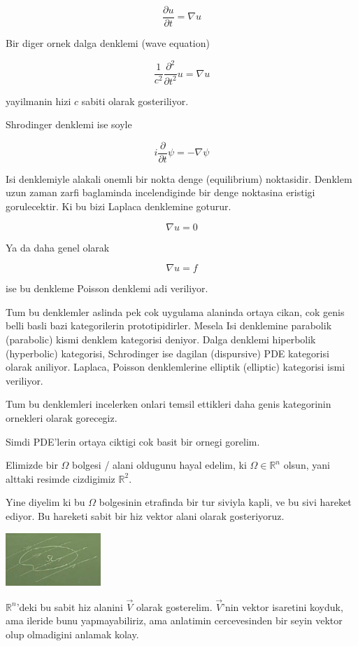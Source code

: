 \documentclass[12pt,fleqn]{article}
\begin{document}
\[ \frac{\partial u}{\partial t} = 
\nabla  u
\]

Bir diger ornek dalga denklemi (wave equation)

\[ \frac{1}{c^2} \frac{\partial ^2}{\partial t^2}u = \nabla u\]

yayilmanin hizi $c$ sabiti olarak gosteriliyor. 

Shrodinger denklemi ise soyle

\[ i \frac{\partial }{\partial t}\psi  = -\nabla \psi \]

Isi denklemiyle alakali onemli bir nokta denge (equilibrium)
noktasidir. Denklem uzun zaman zarfi baglaminda incelendiginde bir denge
noktasina eristigi gorulecektir. Ki bu bizi Laplaca denklemine goturur. 

\[ \nabla u = 0 \]

Ya da daha genel olarak 

\[ \nabla u = f \]

ise bu denkleme Poisson denklemi adi veriliyor. 

Tum bu denklemler aslinda pek cok uygulama alaninda ortaya cikan, cok genis
belli basli bazi kategorilerin prototipidirler. Mesela Isi denklemine
parabolik (parabolic) kismi denklem kategorisi deniyor. Dalga denklemi
hiperbolik (hyperbolic) kategorisi, Schrodinger ise dagilan (dispursive)
PDE kategorisi olarak aniliyor. Laplaca, Poisson denklemlerine elliptik
(elliptic) kategorisi ismi veriliyor. 

Tum bu denklemleri incelerken onlari temsil ettikleri daha genis
kategorinin ornekleri olarak gorecegiz. 

Simdi PDE'lerin ortaya ciktigi cok basit bir ornegi gorelim. 

Elimizde bir $\Omega$ bolgesi / alani oldugunu hayal edelim, ki $\Omega \in
\mathbb{R}^n$ olsun, 
yani alttaki resimde cizdigimiz $\mathbb{R}^2$.

Yine diyelim ki bu $\Omega$ bolgesinin etrafinda bir tur siviyla kapli, ve
bu sivi hareket ediyor. Bu hareketi sabit bir hiz vektor alani olarak
gosteriyoruz. 

\includegraphics[height=2cm]{1_1.png}

$\mathbb{R}^n$'deki bu sabit hiz alanini $\vec{V}$ olarak gosterelim. $\vec{V}$'nin vektor isaretini 
koyduk, ama ileride bunu yapmayabiliriz, ama anlatimin cercevesinden bir
seyin  vektor olup olmadigini anlamak kolay. 
\end{document}
